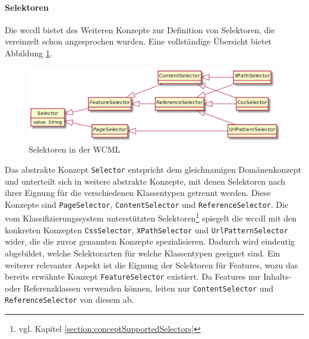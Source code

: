     \paragraph{Selektoren}
    Die \gls{wccdl} bietet des Weiteren Konzepte zur Definition von Selektoren,
    die vereinzelt schon angesprochen wurden.
    Eine vollständige Übersicht bietet Abbildung \ref{image:dslSelectors}.

    \begin{figure}[htb]
        \centering
        \includegraphics[scale=\imageScalingFactor]{../resources/dsl/selectors.png}
        \caption{Selektoren in der WCML}
        \label{image:dslSelectors}
    \end{figure}

    Das abstrakte Konzept \texttt{Selector} entspricht dem gleichnamigen Domänenkonzept
    und unterteilt sich in weitere abstrakte Konzepte,
    mit denen Selektoren nach ihrer Eignung für die verschiedenen Klassentypen getrennt werden.
    Diese Konzepte sind \texttt{PageSelector}, \texttt{ContentSelector} und \texttt{ReferenceSelector}.
    Die vom Klassifizierungssystem unterstützten
    Selektoren\footnote{vgl. Kapitel \ref{section:conceptSupportedSelectors}}
    spiegelt die \gls{wccdl} mit den konkreten Konzepten
    \texttt{CssSelector}, \texttt{XPathSelector} und \texttt{UrlPatternSelector} wider,
    die die zuvor genannten Konzepte spezialisieren.
    Dadurch wird eindeutig abgebildet, welche Selektorarten für welche Klassentypen geeignet sind.
    Ein weiterer relevanter Aspekt ist die Eignung der Selektoren für Features,
    wozu das bereits erwähnte Konzept \texttt{FeatureSelector} existiert.
    Da Features nur Inhalts- oder Referenzklassen verwenden können,
    leiten nur \texttt{ContentSelector} und \texttt{ReferenceSelector} von diesem ab.
    